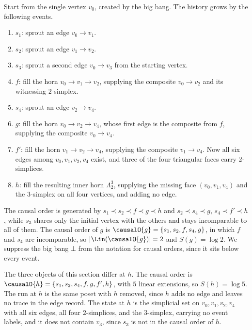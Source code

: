 \begin{example}
\label{ex:run}
Start from the single vertex $v_0$, created by the big bang.
The history grows by the following events.
\begin{enumerate}
  \item $s_1$: sprout an edge $v_0 \to v_1$.
  \item $s_2$: sprout an edge $v_1 \to v_2$.
  \item $s_3$: sprout a second edge $v_0 \to v_3$ from the starting vertex.
  \item $f$: fill the horn $v_0 \to v_1 \to v_2$, supplying the composite $v_0 \to v_2$ and its witnessing $2$-simplex.
  \item $s_4$: sprout an edge $v_2 \to v_4$.
  \item $g$: fill the horn $v_0 \to v_2 \to v_4$, whose first edge is the composite from $f$, supplying the composite $v_0 \to v_4$.
  \item $f'$: fill the horn $v_1 \to v_2 \to v_4$, supplying the composite $v_1 \to v_4$.
        Now all six edges among $v_0, v_1, v_2, v_4$ exist, and three of the four triangular faces carry $2$-simplices.
  \item $h$: fill the resulting inner horn $\Lambda^3_2$, supplying the missing face $(v_0, v_1, v_4)$ and the $3$-simplex on all four vertices, and adding no edge.
\end{enumerate}

The causal order is generated by $s_1 \prec s_2 \prec f \prec g \prec h$ and $s_2 \prec s_4 \prec g$, $s_4 \prec f' \prec h$, while $s_3$ shares only the initial vertex with the others and stays incomparable to all of them.
The causal order of $g$ is $\causalO{g} = \{s_1, s_2, f, s_4, g\}$, in which $f$ and $s_4$ are incomparable, so $|\Lin(\causalO{g})| = 2$ and $S(g) = \log 2$.
We suppress the big bang $\bot$ from the notation for causal orders, since it sits below every event.

The three objects of this section differ at $h$.
The causal order is $\causalO{h} = \{s_1, s_2, s_4, f, g, f', h\}$, with $5$ linear extensions, so $S(h) = \log 5$.
The run at $h$ is the same poset with $h$ removed, since $h$ adds no edge and leaves no trace in the edge record.
The state at $h$ is the simplicial set on $v_0, v_1, v_2, v_4$ with all six edges, all four $2$-simplices, and the $3$-simplex, carrying no event labels, and it does not contain $v_3$, since $s_3$ is not in the causal order of $h$.
\end{example}

